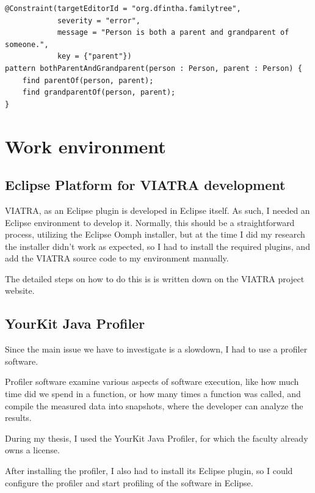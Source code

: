 \documentclass[11pt,a4paper,oneside]{report}
\begin{document}
\begin{lstlisting}[frame=single]
@Constraint(targetEditorId = "org.dfintha.familytree",
            severity = "error",
            message = "Person is both a parent and grandparent of someone.",
            key = {"parent"})
pattern bothParentAndGrandparent(person : Person, parent : Person) {
    find parentOf(person, parent);
    find grandparentOf(person, parent);
}
\end{lstlisting}

\section{Work environment}
\subsection{Eclipse Platform for VIATRA development}
VIATRA, as an Eclipse plugin is developed in Eclipse itself. As such, I needed
an Eclipse environment to develop it. Normally, this should be a straightforward
process, utilizing the Eclipse Oomph installer, but at the time I did my
research the installer didn't work as expected, so I had to install the required
plugins, and add the VIATRA source code to my environment manually.

The detailed steps on how to do this is is written down on the VIATRA project
website.

\subsection{YourKit Java Profiler}
Since the main issue we have to investigate is a slowdown, I had to use a
profiler software.

Profiler software examine various aspects of software execution, like how much
time did we spend in a function, or how many times a function was called, and
compile the measured data into snapshots, where the developer can analyze the
results.

During my thesis, I used the YourKit Java Profiler, for which the faculty
already owns a license.

After installing the profiler, I also had to install its Eclipse plugin, so I
could configure the profiler and start profiling of the software in Eclipse.
\end{document}
